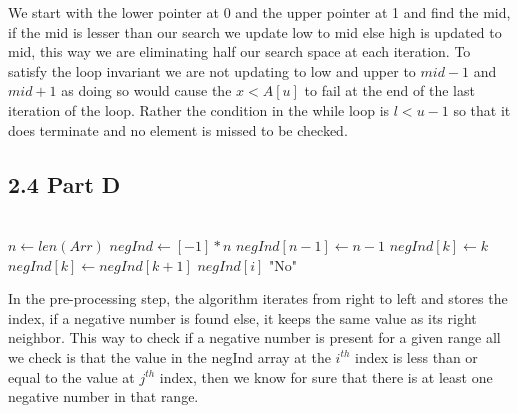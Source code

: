 \documentclass[12pt]{article}
\begin{document}
We start with the lower pointer at 0 and the upper pointer at 1 and find the mid, if the mid is lesser than our search we update low to mid else high is updated to mid, this way we are eliminating half our search space at each iteration. To satisfy the loop invariant we are not updating to low and upper to \(mid-1\) and \(mid+1\) as doing so would cause the \(x<A[u]\) to fail at the end of the last iteration of the loop. Rather the condition in the while loop is \(l<u-1\) so that it does terminate and no element is missed to be checked.

\subsection*{2.4 Part D}
\vspace{10pt}

\begin{algorithmic}
 \\
\State $n \gets len(Arr)$ \quad {}
\State $negInd \gets [-1]*n$
\State $negInd[n-1] \gets n-1$
\EndIf
{} \quad {}
\State $negInd[k] \gets k$ \quad {}
\Else
\State $negInd[k] \gets negInd[k+1]$ \quad {}
\EndIf
\EndFor
{} 
\Return $negInd[i]$
\EndIf
\Return "No" \quad {}
\EndProcedure
\end{algorithmic}

In the pre-processing step, the algorithm iterates from right to left and stores the index, if a negative number is found else, it keeps the same value as its right neighbor. This way to check if a negative number is present for a given range all we check is that the value in the negInd array at the $i^{th}$ index is less than or equal to the value at $j^{th}$ index, then we know for sure that there is at least one negative number in that range. 
\end{document}
